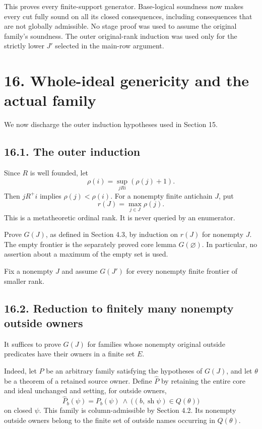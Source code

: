 \documentclass[
  11pt,
  letterpaper,
]{article}
\newcounter{none} %
\begin{document}
This proves every finite-support generator. Base-logical soundness now
makes every cut fully sound on all its closed consequences, including
consequences that are not globally admissible. No stage proof was used
to assume the original family's soundness. The outer original-rank
induction was used only for the strictly lower \(J'\) selected in the
main-row argument.

\section{16. Whole-ideal genericity and the actual
family}\label{whole-ideal-genericity-and-the-actual-family}

We now discharge the outer induction hypotheses used in Section 15.

\subsection{16.1. The outer induction}\label{the-outer-induction}

Since \(R\) is well founded, let \[
\rho(i)=\sup_{jRi}(\rho(j)+1).
\] Then \(jR^+i\) implies \(\rho(j)<\rho(i)\). For a nonempty finite
antichain \(J\), put \[
r(J)=\max_{j\in J}\rho(j).
\] This is a metatheoretic ordinal rank. It is never queried by an
enumerator.

Prove \(G(J)\), as defined in Section 4.3, by induction on \(r(J)\) for
nonempty \(J\). The empty frontier is the separately proved core lemma
\(G(\varnothing)\). In particular, no assertion about a maximum of the
empty set is used.

Fix a nonempty \(J\) and assume \(G(J')\) for every nonempty finite
frontier of smaller rank.

\subsection{16.2. Reduction to finitely many nonempty outside
owners}\label{reduction-to-finitely-many-nonempty-outside-owners}

It suffices to prove \(G(J)\) for families whose nonempty original
outside predicates have their owners in a finite set \(E\).

Indeed, let \(P\) be an arbitrary family satisfying the hypotheses of
\(G(J)\), and let \(\theta\) be a theorem of a retained source owner.
Define \(\widehat P\) by retaining the entire core and ideal unchanged
and setting, for outside owners, \[
\widehat P_b(\psi)=
P_b(\psi)\ \land\
\bigl((b,\operatorname{sh}\psi)\in Q(\theta)\bigr)
\] on closed \(\psi\). This family is column-admissible by Section 4.2.
Its nonempty outside owners belong to the finite set of outside names
occurring in \(Q(\theta)\).
\end{document}
